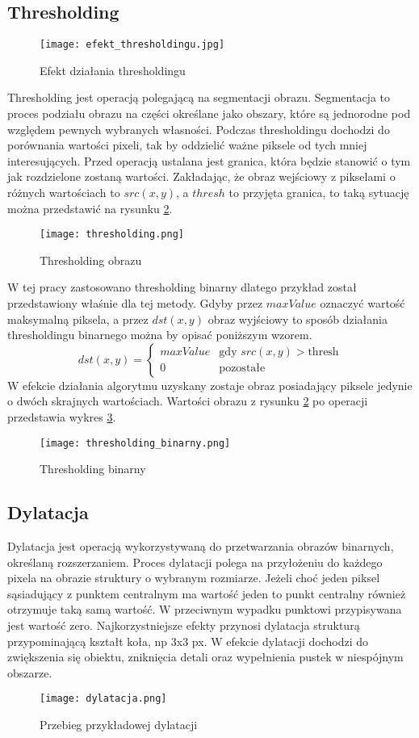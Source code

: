 \subsection{Thresholding}
\begin{figure}[H]
	\centering
	\texttt{[image: efekt\_thresholdingu.jpg]}
	\caption{Efekt działania thresholdingu}
	\label{fig:efekt_thresholdingu}
\end{figure}
Thresholding jest operacją polegającą na segmentacji obrazu. Segmentacja to proces podziału obrazu na części określane jako obszary, które są jednorodne pod względem pewnych wybranych własności. Podczas thresholdingu dochodzi do porównania wartości pixeli, tak by oddzielić ważne piksele od tych mniej interesujących. Przed operacją ustalana jest granica, która będzie stanowić o tym jak rozdzielone zostaną wartości.
Zakładając, że obraz wejściowy z pikselami o różnych wartościach to $ src(x,y) $, a $thresh$ to przyjęta granica, to taką sytuację można przedstawić na rysunku \ref{fig:thresholding}.
\begin{figure}[H]
	\centering
	\texttt{[image: thresholding.png]}
	\caption{Thresholding obrazu}
	\label{fig:thresholding}
\end{figure}
W tej pracy zastosowano thresholding binarny dlatego przykład został przedstawiony właśnie dla tej metody. Gdyby przez $maxValue$ oznaczyć wartość maksymalną piksela, a przez $dst(x,y)$ obraz wyjściowy to sposób działania thresholdingu binarnego można by opisać poniższym wzorem.
$$
dst(x,y) = \left\{ \begin{array}{ll}
maxValue & \textrm{gdy $src(x,y)>$thresh}\\
0 & \textrm{pozostałe}
\end{array} \right.
$$
W efekcie działania algorytmu uzyskany zostaje obraz posiadający piksele jedynie o dwóch skrajnych wartościach. Wartości obrazu z rysunku \ref{fig:thresholding} po operacji przedstawia wykres \ref{fig:thresholding_binarny}.
\begin{figure}[H]
	\centering
	\texttt{[image: thresholding\_binarny.png]}
	\caption{Thresholding binarny}
	\label{fig:thresholding_binarny}
\end{figure}

\subsection{Dylatacja}
Dylatacja jest operacją wykorzystywaną do przetwarzania obrazów binarnych, określaną rozszerzaniem. Proces dylatacji polega na przyłożeniu do każdego pixela na obrazie struktury o wybranym rozmiarze. Jeżeli choć jeden piksel sąsiadujący z punktem centralnym ma wartość jeden to punkt centralny również otrzymuje taką samą wartość. W przeciwnym wypadku punktowi przypisywana jest wartość zero. Najkorzystniejsze efekty przynosi dylatacja strukturą przypominającą kształt koła, np 3x3 px. W efekcie dylatacji dochodzi do zwiększenia się obiektu, zniknięcia detali oraz wypełnienia pustek w niespójnym obszarze.
\begin{figure}[H]
	\centering
	\texttt{[image: dylatacja.png]}
	\caption{Przebieg przykładowej dylatacji}
	\label{fig:dylatacja}
\end{figure}

